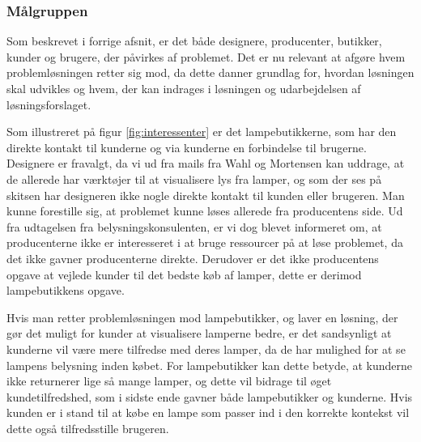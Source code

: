 \subsubsection{Målgruppen}
Som beskrevet i forrige afsnit, er det både designere, producenter, butikker, kunder og brugere, der påvirkes af problemet. Det er nu relevant at afgøre hvem problemløsningen retter sig mod, da dette danner grundlag for, hvordan løsningen skal udvikles og hvem, der kan indrages i løsningen og udarbejdelsen af løsningsforslaget.

Som illustreret på figur \ref{fig:interessenter} er det lampebutikkerne, som har den direkte kontakt til kunderne og via kunderne en forbindelse til brugerne. Designere er fravalgt, da vi ud fra mails fra Wahl og Mortensen kan uddrage, at de allerede har værktøjer til at visualisere lys fra lamper, og som der ses på skitsen har designeren ikke nogle direkte kontakt til kunden eller brugeren. Man kunne forestille sig, at problemet kunne løses allerede fra producentens side. Ud fra udtagelsen fra belysningskonsulenten, er vi dog blevet informeret om, at producenterne ikke er interesseret i at bruge ressourcer på at løse problemet, da det ikke gavner producenterne direkte. Derudover er det ikke producentens opgave at vejlede kunder til det bedste køb af lamper, dette er derimod lampebutikkens opgave.

Hvis man retter problemløsningen mod lampebutikker, og laver en løsning, der gør det muligt for kunder at visualisere lamperne bedre, er det sandsynligt at kunderne vil være mere tilfredse med deres lamper, da de har mulighed for at se lampens belysning inden købet. For lampebutikker kan dette betyde, at kunderne ikke returnerer lige så mange lamper, og dette vil bidrage til øget kundetilfredshed, som i sidste ende gavner både lampebutikker og kunderne. Hvis kunden er i stand til at købe en lampe som passer ind i den korrekte kontekst vil dette også tilfredsstille brugeren. 